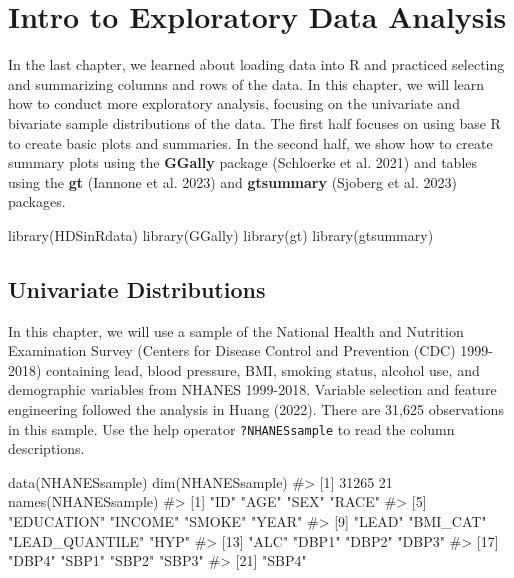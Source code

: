 \documentclass[
  letterpaper,
]{krantz}
\makeatletter
\newenvironment{Shaded}{\begin{snugshade}}{\end{snugshade}}
\newcommand{\CommentTok}[1]{\textcolor[rgb]{0.37,0.37,0.37}{#1}}
\newcommand{\FunctionTok}[1]{\textcolor[rgb]{0.28,0.35,0.67}{#1}}
\newcommand{\NormalTok}[1]{\textcolor[rgb]{0.00,0.23,0.31}{#1}}
\newenvironment{kframe}{%
\medskip{}
\setlength{\fboxsep}{.8em}
 \def\at@end@of@kframe{}%
 \ifinner\ifhmode%
  \def\at@end@of@kframe{\end{minipage}}%
  \begin{minipage}{\columnwidth}%
 \fi\fi%
 \def\FrameCommand##1{\hskip\@totalleftmargin \hskip-\fboxsep
 \colorbox{shadecolor}{##1}\hskip-\fboxsep
     \hskip-\linewidth \hskip-\@totalleftmargin \hskip\columnwidth}%
 \MakeFramed {\advance\hsize-\width
   \@totalleftmargin\z@ \linewidth\hsize
   \@setminipage}}%
 {\par\unskip\endMakeFramed%
 \at@end@of@kframe}
\renewenvironment{Shaded}{\begin{kframe}}{\end{kframe}}
\makeatother
\begin{document}
\chapter{Intro to Exploratory Data Analysis}\label{sec-exploratory}

In the last chapter, we learned about loading data into R and practiced
selecting and summarizing columns and rows of the data. In this chapter,
we will learn how to conduct more exploratory analysis, focusing on the
univariate and bivariate sample distributions of the data. The first
half focuses on using base R to create basic plots and summaries. In the
second half, we show how to create summary plots using the
\textbf{GGally} package (Schloerke et al. 2021) and tables using the
\textbf{gt} (Iannone et al. 2023) and \textbf{gtsummary} (Sjoberg et al.
2023) packages.

\begin{Shaded}
\begin{Highlighting}[]
\FunctionTok{library}\NormalTok{(HDSinRdata)}
\FunctionTok{library}\NormalTok{(GGally) }
\FunctionTok{library}\NormalTok{(gt)}
\FunctionTok{library}\NormalTok{(gtsummary)}
\end{Highlighting}
\end{Shaded}

\section{Univariate Distributions}\label{univariate-distributions}

In this chapter, we will use a sample of the National Health and
Nutrition Examination Survey (Centers for Disease Control and Prevention
(CDC) 1999-2018) containing lead, blood pressure, BMI, smoking status,
alcohol use, and demographic variables from NHANES 1999-2018. Variable
selection and feature engineering followed the analysis in Huang (2022).
There are 31,625 observations in this sample. Use the help operator
\texttt{?NHANESsample} to read the column descriptions.

\begin{Shaded}
\begin{Highlighting}[]
\FunctionTok{data}\NormalTok{(NHANESsample)}
\FunctionTok{dim}\NormalTok{(NHANESsample)}
\CommentTok{\#\textgreater{} [1] 31265    21}
\FunctionTok{names}\NormalTok{(NHANESsample)}
\CommentTok{\#\textgreater{}  [1] "ID"            "AGE"           "SEX"           "RACE"         }
\CommentTok{\#\textgreater{}  [5] "EDUCATION"     "INCOME"        "SMOKE"         "YEAR"         }
\CommentTok{\#\textgreater{}  [9] "LEAD"          "BMI\_CAT"       "LEAD\_QUANTILE" "HYP"          }
\CommentTok{\#\textgreater{} [13] "ALC"           "DBP1"          "DBP2"          "DBP3"         }
\CommentTok{\#\textgreater{} [17] "DBP4"          "SBP1"          "SBP2"          "SBP3"         }
\CommentTok{\#\textgreater{} [21] "SBP4"}
\end{Highlighting}
\end{Shaded}
\end{document}
